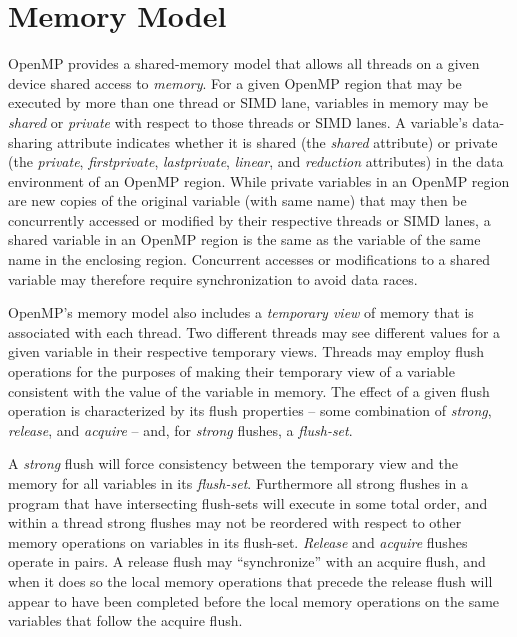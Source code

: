 \pagebreak
\chapter{Memory Model}
\label{chap:memory_model}

OpenMP provides a shared-memory model that allows all threads on a given
device shared access to \emph{memory}. For a given OpenMP region that may be
executed by more than one thread or SIMD lane, variables in memory may be
\emph{shared} or \emph{private} with respect to those threads or SIMD lanes. A
variable's data-sharing attribute indicates whether it is shared (the
\emph{shared} attribute) or private (the \emph{private}, \emph{firstprivate},
\emph{lastprivate}, \emph{linear}, and \emph{reduction} attributes) in the data
environment of an OpenMP region. While private variables in an OpenMP region
are new copies of the original variable (with same name) that may then be
concurrently accessed or modified by their respective threads or SIMD lanes, a
shared variable in an OpenMP region is the same as the variable of the same
name in the enclosing region. Concurrent accesses or modifications to a
shared variable may therefore require synchronization to avoid data races.

OpenMP's memory model also includes a \emph{temporary view} of memory that is
associated with each thread. Two different threads may see different values for
a given variable in their respective temporary views. Threads may employ flush
operations for the purposes of making their temporary view of a variable
consistent with the value of the variable in memory. The effect of a given
flush operation is characterized by its flush properties -- some combination of
\emph{strong}, \emph{release}, and \emph{acquire} -- and, for \emph{strong}
flushes, a \emph{flush-set}. 

A \emph{strong} flush will force consistency between the temporary view and the
memory for all variables in its \emph{flush-set}.  Furthermore all strong flushes in a
program that have intersecting flush-sets will execute in some total order, and
within a thread strong flushes may not be reordered with respect to other
memory operations on variables in its flush-set. \emph{Release} and
\emph{acquire} flushes operate in pairs. A release flush may ``synchronize''
with an acquire flush, and when it does so the local memory operations that
precede the release flush will appear to have been completed before the local
memory operations on the same variables that follow the acquire flush.

